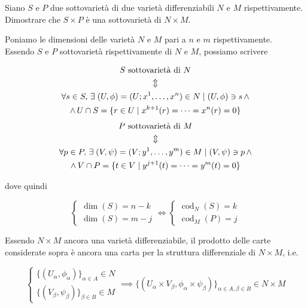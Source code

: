 \begin{tcolorbox}
	Siano $ S $ e $ P $ due sottovarietà di due varietà differenziabili $ N $ e $ M $ rispettivamente. Dimostrare che $ S \times P $ è una sottovarietà di $ N \times M $.
\end{tcolorbox}

Poniamo le dimensioni delle varietà $ N $ e $ M $ pari a $ n $ e $ m $ rispettivamente.\\
Essendo $ S $ e $ P $ sottovarietà rispettivamente di $ N $ e $ M $, possiamo scrivere

\begin{gather}
	S \text{ sottovarietà di } N \nonumber\\
	\Updownarrow\\
	\forall s \in S, \, \exists \; (U,\phi) = (U; x^{1},\dots,x^{n}) \in N \mid (U,\phi) \ni s \, \wedge \nonumber\\
	\wedge \, U \cap S = \{ r \in U \mid x^{k+1}(r) = \dots = x^{n}(r) = 0 \} \nonumber
\end{gather}
%
\begin{gather}
	P \text{ sottovarietà di } M \nonumber\\
	\Updownarrow\\
	\forall p \in P, \, \exists \; (V,\psi) = (V; y^{1},\dots,y^{m}) \in M \mid (V,\psi) \ni p \, \wedge \nonumber\\
	\wedge \, V \cap P = \{ t \in V \mid y^{j+1}(t) = \dots = y^{m}(t) = 0 \} \nonumber
\end{gather}

dove quindi

\begin{equation}
	\begin{cases}
		\dim(S) = n - k\\
		\dim(S) = m - j
	\end{cases} %
	\iff %
	\begin{cases}
		\operatorname{cod}_{N}(S) = k\\
		\operatorname{cod}_{M}(P) = j
	\end{cases}
\end{equation}

Essendo $ N \times M $ ancora una varietà differenziabile, il prodotto delle carte considerate sopra è ancora una carta per la struttura differenziale di $ N \times M $, i.e.

\begin{equation}
	\begin{cases}
		\{(U_{\alpha},\phi_{\alpha})\}_{\alpha \in A} \in N \\
		\{(V_{\beta},\psi_{\beta})\}_{\beta \in B} \in M
	\end{cases} %
	\implies %
	\{(U_{\alpha} \times V_{\beta}, \phi_{\alpha} \times \psi_{\beta})\}_{\alpha \in A, \beta \in B} \in N \times M
\end{equation}

